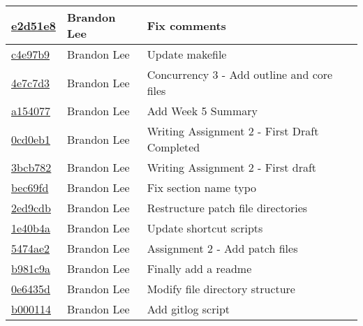 \documentclass[letterpaper,10pt,titlepage]{article}
\begin{document}
\begin{tabular}{l l l}
\href{https://github.com/brandonlee503/Operating-Systems-II/commit/e2d51e8d76a94e1b7aff691063caabe203cd24af}{e2d51e8} & Brandon Lee & Fix comments\\\hline
\href{https://github.com/brandonlee503/Operating-Systems-II/commit/c4e97b9e39c3fdd1e75e5251806c8ff4014a2390}{c4e97b9} & Brandon Lee & Update makefile\\\hline
\href{https://github.com/brandonlee503/Operating-Systems-II/commit/4e7c7d345149160901300f36322cc74ad8a2e847}{4e7c7d3} & Brandon Lee & Concurrency 3 - Add outline and core files\\\hline
\href{https://github.com/brandonlee503/Operating-Systems-II/commit/a154077e72b345a63298daafe214af91ef36eb54}{a154077} & Brandon Lee & Add Week 5 Summary\\\hline
\href{https://github.com/brandonlee503/Operating-Systems-II/commit/0cd0eb1d541b9b592d322a34be7f9bae9e6da7ac}{0cd0eb1} & Brandon Lee & Writing Assignment 2 - First Draft Completed\\\hline
\href{https://github.com/brandonlee503/Operating-Systems-II/commit/3bcb782120ad1e9ebdd822c9f89775f330a93da9}{3bcb782} & Brandon Lee & Writing Assignment 2 - First draft\\\hline
\href{https://github.com/brandonlee503/Operating-Systems-II/commit/bec69fd13b88df6a21023c87fc89d88d8bcb1bcc}{bec69fd} & Brandon Lee & Fix section name typo\\\hline
\href{https://github.com/brandonlee503/Operating-Systems-II/commit/2ed9cdb0f476813d75f1dc61a3b63a66e6dd835e}{2ed9cdb} & Brandon Lee & Restructure patch file directories\\\hline
\href{https://github.com/brandonlee503/Operating-Systems-II/commit/1e40b4a8b356207a41012b49f71c9f546613b438}{1e40b4a} & Brandon Lee & Update shortcut scripts\\\hline
\href{https://github.com/brandonlee503/Operating-Systems-II/commit/5474ae2582b9346800aba6fe06e45d195b612ca9}{5474ae2} & Brandon Lee & Assignment 2 - Add patch files\\\hline
\href{https://github.com/brandonlee503/Operating-Systems-II/commit/b981c9a933d4cf30a2794635fd0bfce0fa14f9fd}{b981c9a} & Brandon Lee & Finally add a readme\\\hline
\href{https://github.com/brandonlee503/Operating-Systems-II/commit/0e6435d21d732734f04803b43675133ba2f4f85b}{0e6435d} & Brandon Lee & Modify file directory structure\\\hline
\href{https://github.com/brandonlee503/Operating-Systems-II/commit/b000114135a201bd2d22d1209be952c7599616ed}{b000114} & Brandon Lee & Add gitlog script\\\hline

\end{tabular}
\end{document}

